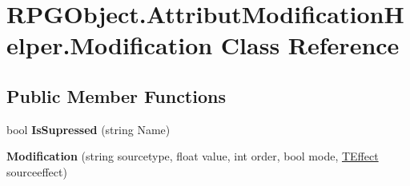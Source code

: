 \hypertarget{class_r_p_g_object_1_1_attribut_modification_helper_1_1_modification}{}\section{R\+P\+G\+Object.\+Attribut\+Modification\+Helper.\+Modification Class Reference}
\label{class_r_p_g_object_1_1_attribut_modification_helper_1_1_modification}
\subsection*{Public Member Functions}
\begin{DoxyCompactItemize}
\item 
\hypertarget{class_r_p_g_object_1_1_attribut_modification_helper_1_1_modification_af5220719b5d5a37d3d3d3383ad54c5a4}{}bool {\bfseries Is\+Supressed} (string Name)\label{class_r_p_g_object_1_1_attribut_modification_helper_1_1_modification_af5220719b5d5a37d3d3d3383ad54c5a4}

\item 
\hypertarget{class_r_p_g_object_1_1_attribut_modification_helper_1_1_modification_afa6572bc4595f877a06bb6c5d7d1863c}{}{\bfseries Modification} (string sourcetype, float value, int order, bool mode, \hyperlink{class_t_effect}{T\+Effect} sourceeffect)\label{class_r_p_g_object_1_1_attribut_modification_helper_1_1_modification_afa6572bc4595f877a06bb6c5d7d1863c}

\end{DoxyCompactItemize}
